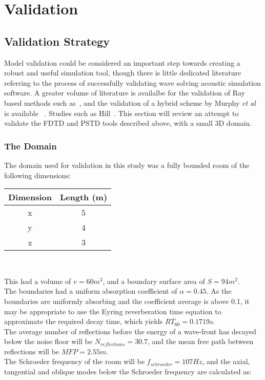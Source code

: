 
\chapter{Validation}
\section{Validation Strategy}
Model validation could be considered an important step towards creating a robust and useful simulation tool, though there is little dedicated literature referring to the process of successfully validating wave solving acoustic simulation software. A greater volume of literature is availalbe for the validation of Ray based methods such as~\cite{Ahnert2005,Tsingos2002}, and the validation of a hybrid scheme by Murphy \textit{et al} is available ~\cite{Southern2013}. Studies such as Hill~\cite{Hill2012}. This section will review an attempt to validate the FDTD and PSTD tools described above, with a small 3D domain.\\

\subsection{The Domain}
The domain used for validation in this study was a fully bounded room of the following dimensions:\\

\begin{center}
\begin{tabular}{|c|c|} 
  \hline
 Dimension & Length (m) \\
 \hline
 x & 5 \\ 
 y & 4 \\  
 z & 3 \\  
 \hline
\end{tabular}\\
\end{center}

This had a volume of $ v = 60m^3$, and a boundary surface area of $S = 94m^2$.\\
The boundaries had a uniform absorption coefficient of $\alpha = 0.45 $. As the boundaries are uniformly absorbing and the coefficient average is above 0.1, it may be appropriate to use the Eyring reverberation time equation to approximate the required decay time, which yields $RT_{60} = 0.1719s $.\\
The average number of reflections before the energy of a wave-front has decayed below the noise floor will be $N_{reflections} = 30.7$, and the mean free path between reflections will be $MFP = 2.55m$.\\
The Schroeder frequency of the room will be $f_{schroeder} = 107Hz $, and the axial, tangential and oblique modes below the Schroeder frequency are calculated as:\\

